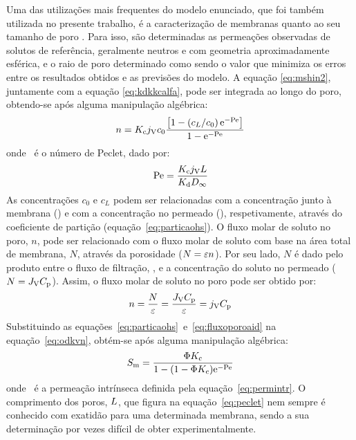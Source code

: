 Uma das utilizações mais frequentes do modelo enunciado, que foi também utilizada no presente trabalho, é a caracterização de membranas quanto ao seu tamanho de poro \cite{moraompa,moraotese,moraodes,bowen02}. 
Para isso, são determinadas as permeações observadas de solutos de referência, geralmente neutros e com geometria aproximadamente esférica, e o raio de poro determinado como sendo o valor que minimiza os erros entre os resultados obtidos e as previsões do modelo. A equação \ref{eq:mshin2}, juntamente com a equação \ref{eq:kdkkcalfa}, pode ser integrada ao longo do poro, obtendo-se após alguma manipulação algébrica:
\begin{equation}
	\label{eq:odkvn}
	n=K_{\mathrm{c}}j_{\mathrm{V}} c_0\frac{\left[1-\left(c_L/c_0\right)\mathrm{e}^{-\mathrm{Pe}}\right]}{1-\mathrm{e}^{-\mathrm{Pe}}}
\end{equation}
onde \peclet\ é o número de Peclet, dado por:
\begin{equation}
	\label{eq:peclet}
	\mathrm{Pe}=\frac{K_{\mathrm{c}}j_{\mathrm{V}}L}{K_{\mathrm{d}}D_{\mathit{\infty}}}
\end{equation}%
As concentrações $c_0$ e $c_L$ podem ser relacionadas com a concentração junto à membrana (\concm) e com a concentração no permeado (\concp), respetivamente, através do coeficiente de partição (equação~\ref{eq:particaohs}). 
O fluxo molar de soluto no poro, $n$, pode ser relacionado com o fluxo molar de soluto com base na área total de membrana, $N$, através da porosidade ($N=\varepsilon n$). Por seu lado, $N$ é dado pelo produto entre o fluxo de filtração, \fluxo, e a concentração do soluto no permeado ($N=J_{\mathrm{V}}C_{\mathrm{p}}$). Assim, o fluxo molar de soluto no poro pode ser obtido por:
\begin{equation}
	\label{eq:fluxoporoaid}
	n=\frac{N}{\varepsilon}=\frac{J_{\mathrm{V}}C_{\mathrm{p}}}{\varepsilon}=j_{\mathrm{V}}C_{\mathrm{p}}
\end{equation}
Substituindo as equações~\ref{eq:particaohs}~e~\ref{eq:fluxoporoaid} na equação~\ref{eq:odkvn}, obtém-se após alguma manipulação algébrica:
\begin{equation}
	\label{eq:smhindered}
	S_{\mathrm{m}}=\frac{\Phi K_{\mathrm{c}}}{1-(1-\Phi K_{\mathrm{c}})\mathrm{e}^{-\mathrm{Pe}}}
\end{equation}%
onde \permm\ é a permeação intrínseca definida pela equação~\ref{eq:permintr}. O comprimento dos poros, $L$, que figura na equação~\ref{eq:peclet} nem sempre é conhecido com exatidão para uma determinada membrana, sendo a sua determinação por vezes difícil de obter experimentalmente.
